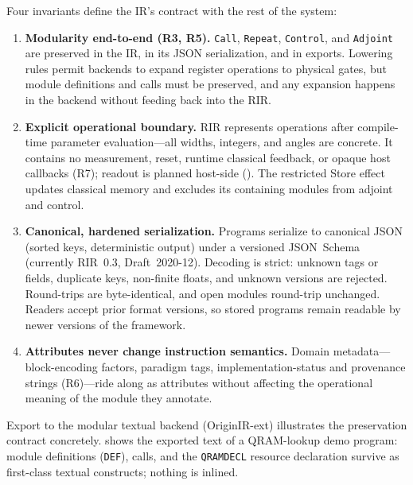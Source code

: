 Four invariants define the IR's contract with the rest of the system:

\begin{enumerate}
\item \textbf{Modularity end-to-end (R3, R5).}  \texttt{Call}, \texttt{Repeat},
  \texttt{Control}, and \texttt{Adjoint} are preserved in the IR, in its JSON
  serialization, and in exports.  Lowering rules permit backends to expand
  register operations to physical gates, but module definitions and calls
  must be preserved, and any expansion happens in the backend without
  feeding back into the RIR.
\item \textbf{Explicit operational boundary.} RIR represents operations after compile-time
  parameter evaluation---all widths, integers, and angles are concrete.  It
  contains no measurement, reset, runtime classical feedback, or opaque host
  callbacks (R7); readout is planned host-side
  (). The restricted Store effect updates classical
  memory and excludes its containing modules from adjoint and control.
\item \textbf{Canonical, hardened serialization.}  Programs serialize to
  canonical JSON (sorted keys, deterministic output) under a versioned
  JSON~Schema (currently RIR~0.3, Draft~2020-12).  Decoding is strict:
  unknown tags or fields, duplicate keys, non-finite floats, and unknown
  versions are rejected.  Round-trips are byte-identical, and open modules
  round-trip unchanged.  Readers accept prior format versions, so stored
  programs remain readable by newer versions of the framework.
\item \textbf{Attributes never change instruction semantics.}  Domain
  metadata---block-encoding factors, paradigm tags, implementation-status and
  provenance strings (R6)---ride along as attributes without affecting the
  operational meaning of the module they annotate.
\end{enumerate}

Export to the modular textual backend (OriginIR-ext) illustrates the
preservation contract concretely.   shows the exported
text of a QRAM-lookup demo program: module definitions (\texttt{DEF}),
calls, and the \texttt{QRAMDECL} resource declaration survive as first-class
textual constructs; nothing is inlined.

